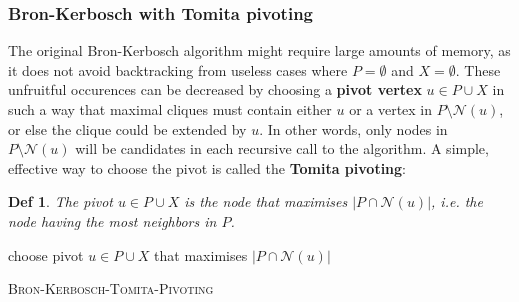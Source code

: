 \documentclass[11pt]{article}
\newtheorem*{definition}{Def}
\begin{document}
    \hypertarget{bron-kerbosch-with-tomita-pivoting}{%
\subsubsection{Bron-Kerbosch with Tomita
pivoting}\label{bron-kerbosch-with-tomita-pivoting}}

The original Bron-Kerbosch algorithm might require large amounts of
memory, as it does not avoid backtracking from useless cases where
\(P = \emptyset\) and \(X = \emptyset\). These unfruitful occurences can
be decreased by choosing a \textbf{pivot vertex} \(u \in P \cup X\) in
such a way that maximal cliques must contain either \(u\) or a vertex in
\(P \setminus \mathcal{N}(u)\), or else the clique could be extended by
\(u\). In other words, only nodes in \(P \setminus \mathcal{N}(u)\) will
be candidates in each recursive call to the algorithm. A simple,
effective way to choose the pivot is called the \textbf{Tomita
pivoting}\cite{bk_tomita}:

\begin{definition}
The pivot \(u \in P \cup X\) is the node that maximises
\(|P \cap \mathcal{N}(u)|\), i.e. the node having the most neighbors in
\(P\).
\end{definition}

\begin{algorithm}[H]
\DontPrintSemicolon
\SetAlgoLined

  
  \BlankLine
  \BlankLine
  
    choose pivot $u \in P \cup X$ that maximises $| P \cap \mathcal{N}(u)|$\\
  
\caption{\textsc{Bron-Kerbosch-Tomita-Pivoting}}
\end{algorithm}
\end{document}
